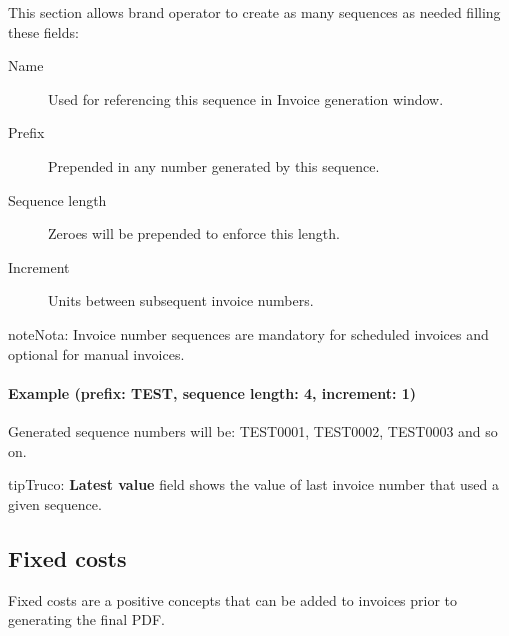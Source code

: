 \documentclass[letterpaper,10pt,spanish]{sphinxmanual}
\begin{document}
This section allows brand operator to create as many sequences as needed filling these fields:
\begin{description}
\item[{Name}] \leavevmode{}\label{administration_portal/brand/invoicing/invoice_number_sequences:term-name}
Used for referencing this sequence in Invoice generation window.

\item[{Prefix}] \leavevmode{}\label{administration_portal/brand/invoicing/invoice_number_sequences:term-prefix}
Prepended in any number generated by this sequence.

\item[{Sequence length}] \leavevmode{}\label{administration_portal/brand/invoicing/invoice_number_sequences:term-sequence-length}
Zeroes will be prepended to enforce this length.

\item[{Increment}] \leavevmode{}\label{administration_portal/brand/invoicing/invoice_number_sequences:term-increment}
Units between subsequent invoice numbers.

\end{description}

\begin{notice}{note}{Nota:}
Invoice number sequences are mandatory for scheduled invoices and optional for manual invoices.
\end{notice}
\paragraph{Example (prefix: TEST, sequence length: 4, increment: 1)}

Generated sequence numbers will be: TEST0001, TEST0002, TEST0003 and so on.

\begin{notice}{tip}{Truco:}
\textbf{Latest value} field shows the value of last invoice number that used a given sequence.
\end{notice}


\subsection{Fixed costs}
\label{administration_portal/brand/invoicing/fixed_costs:fixed-costs}\label{administration_portal/brand/invoicing/fixed_costs::doc}
Fixed costs are a positive concepts that can be added to invoices prior to generating the final PDF.
\end{document}
